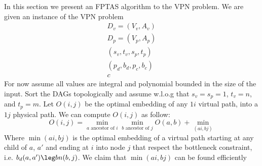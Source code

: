 In this section we present an FPTAS algorithm to the VPN problem.
We are given an instance of the VPN problem 
\begin{align}
D_v = (V_v, A_v)			\\
D_p = (V_p, A_p)			\\
(s_v, t_v, s_p, t_p)	\\
(p_d, b_d, p_c, b_c)	\\
c
\end{align}
For now assume all values are integral and polynomial bounded in the size of the input.
Sort the DAGs topologically and assume w.l.o.g that $s_v = s_p = 1$,
$t_v = n$, and $t_p = m$.
Let $O(i, j)$ be the optimal embedding of any $1i$ virtual path, 
into a $1j$ physical path.
We can compute $O(i, j)$ as follow:
$$
O(i, j) = \min_{a \text{ ancestor of } i} \min_{b \text{ ancestor of } j} O(a, b)
+ \min_(ai, bj)
$$
Where $\min(ai, bj)$ is the optimal embedding of a virtual 
path starting at any child of $a$, $a'$ and ending at $i$ into node $j$
that respect the bottleneck constraint, i.e. $b_d(a, a') \leg bn(b, j)$.
We claim that $\min(ai, bj)$ can be found efficiently 

